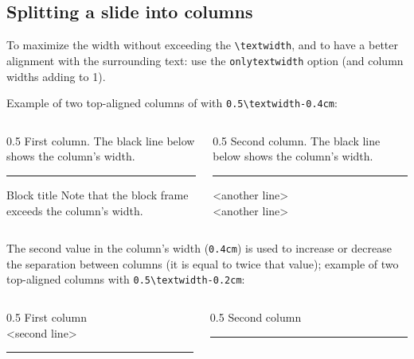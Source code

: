 \documentclass[9pt,english]{Beamer_PROMES}\uselanguage{English}\languagepath{English}
\begin{document}
\subsection{Splitting a slide into columns}
\begin{frame}[fragile]%

To maximize the width without exceeding the \verb=\textwidth=, and to have a better alignment with the surrounding text: use the \verb=onlytextwidth= option (and column widths adding to 1).

Example of two top-aligned columns of with \verb=0.5\textwidth-0.4cm=:

\vspace{3mm}
\begin{columns}[t,onlytextwidth]
   \begin{column}{0.5\textwidth-0.4cm}
      First column. The black line below shows the column's width.
      \par\noindent\rule{\textwidth}{1pt}
      
      \begin{block}{Block title}
         Note that the block frame exceeds the column's width.
      \end{block}
   \end{column}
   \begin{column}{0.5\textwidth-0.4cm}
      Second column. The black line below shows the column's width.
      \par\noindent\rule{\textwidth}{1pt}
      <another line>\\
      <another line>
   \end{column}
\end{columns}
\vspace{3mm}

The second value in the column's width (\verb=0.4cm=) is used to increase or decrease the separation between columns (it is equal to twice that value); example of two top-aligned columns with \verb=0.5\textwidth-0.2cm=:

\vspace{3mm}
\begin{columns}[t,onlytextwidth]
   \begin{column}{0.5\textwidth-0.2cm}
      First column\\
      <second line>
      \par\noindent\rule{\textwidth}{1pt}
   \end{column}
   \begin{column}{0.5\textwidth-0.2cm}
      Second column
      \par\noindent\rule{\textwidth}{1pt}
   \end{column}
\end{columns}

\end{frame}
\end{document}
